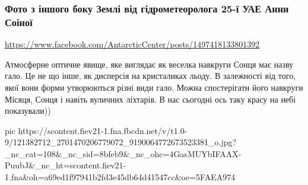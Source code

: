  


\subsubsection{Фото з іншого боку Землі від гідрометеоролога 25-ї УАЕ Анни Соіної}

\url{https://www.facebook.com/AntarcticCenter/posts/1497418133801392}

Атмосферне оптичне явище, яке виглядає як веселка навкруги Сонця має назву
гало. Це не що інше, як дисперсія на кристаликах льоду. В залежності від того,
якої вони форми утворюються різні види гало. Можна спостерігати його навкруги
Місяця, Сонця і навіть вуличних ліхтарів. В нас сьогодні ось таку красу на небі
показували))

\ifcmt
pic https://scontent.fiev21-1.fna.fbcdn.net/v/t1.0-9/121382712_2701470206779072_9190064772673523381_o.jpg?_nc_cat=108&_nc_sid=8bfeb9&_nc_ohc=4GasMUYbIFAAX-PuubJ&_nc_ht=scontent.fiev21-1.fna&oh=a69ed1f97941b2fd3e45db64d41547cc&oe=5FAEA974
\fi
